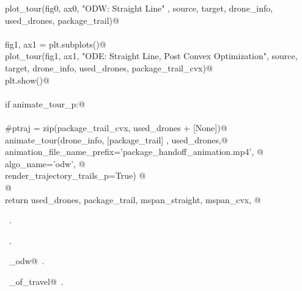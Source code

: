 \documentclass[10.0pt]{report}
\begin{document}
\begin{flushleft}
\begin{list}{}{}
\mbox{}\verb@         plot_tour(fig0, ax0, "ODW: Straight Line"       , source, target, drone_info, used_drones, package_trail)@\\
\mbox{}\verb@@\\
\mbox{}\verb@         fig1, ax1 = plt.subplots()@\\
\mbox{}\verb@         plot_tour(fig1, ax1, "ODE: Straight Line, Post Convex Optimization", source, target, drone_info, used_drones, package_trail_cvx)@\\
\mbox{}\verb@         plt.show()@\\
\mbox{}\verb@@\\
\mbox{}\verb@    if animate_tour_p:@\\
\mbox{}\verb@@\\
\mbox{}\verb@        #ptraj  = zip(package_trail_cvx, used_drones + [None])@\\
\mbox{}\verb@        animate_tour(drone_info, [package_trail] , used_drones,@\\
\mbox{}\verb@                     animation_file_name_prefix='package_handoff_animation.mp4', @\\
\mbox{}\verb@                     algo_name='odw',  @\\
\mbox{}\verb@                     render_trajectory_trails_p=True) @\\
\mbox{}\verb@    @\\
\mbox{}\verb@    return used_drones, package_trail, mspan_straight, mspan_cvx, @\\
\mbox{}\verb@@{\NWsep}
\end{list}
\vspace{-1.5ex}
\footnotesize
\begin{list}{}{\setlength{\itemsep}{-\parsep}\setlength{\itemindent}{-\leftmargin}}
\item \NWtxtMacroDefBy\ .
\item \NWtxtMacroRefIn\ .
\item \NWtxtIdentsDefed\nobreak\  \verb@algo_odw@\nobreak\ .\item \NWtxtIdentsUsed\nobreak\  \verb@time_of_travel@\nobreak\ .
\item{}
\end{list}
\vspace{4ex}
\end{flushleft}
\end{document}
